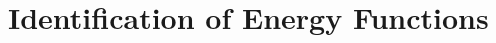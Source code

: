 \chapter[Identification of Energy Functions]{Identification of Energy Functions}

\renewcommand{\row}[5]{
	photo, equation and 3 dashes.
}
\renewcommand{\separation}{
			\multicolumn{2}{c}{}\\[-1em]
	        \hline
	        \multicolumn{2}{c}{}\\[-1em]
}